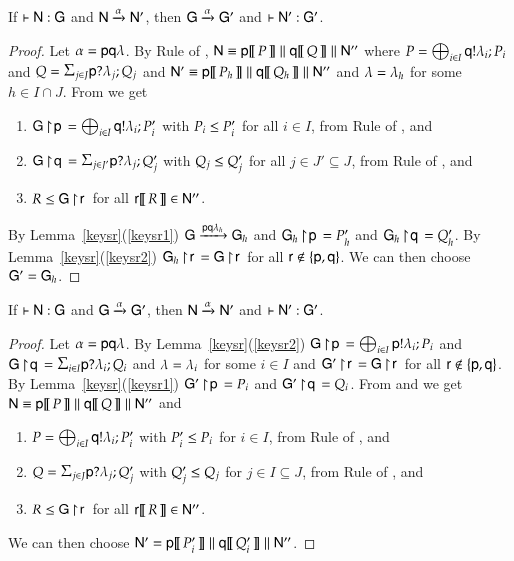 \begin{theorem}
If $\vdash {\sf N} :{\sf G}$ and ${\sf N}\xrightarrow{\alpha}{\sf N}'$, then ${\sf G}\xrightarrow{\alpha}{\sf G}'$ and \mbox{$\vdash {\sf N}' :{\sf G}'$.}
\end{theorem}
\begin{proof}
Let  $\alpha={\sf p}{\sf q}\lambda$. 
By Rule
 of , ${\sf N}\equiv {\sf p}[\![\,P\,]\!]\mathrel{\|} {\sf q}[\![\,Q\,]\!]\mathrel{\|}{\sf N}''$ where
$P=\bigoplus_{i\in I}{\sf q}!\lambda_i;P_i$ and $\Q=\inp\pp{j}{J}{\la}{\Q}$  and 
${\sf N}'\equiv{\sf p}[\![\,P_h\,]\!]\mathrel{\|} {\sf q}[\![\,Q_h\,]\!]\mathrel{\|}{\sf N}''$ and $\lambda=\lambda_h$ for some $h\in I\cap J$.
From  we get
\begin{enumerate}
\item \label{psr1} ${\sf G} \! \upharpoonright \! {\sf p}\,=\bigoplus_{i\in I}{\sf q}!\lambda_i;P'_i$ with
  $P_i\leq P'_i$ for all $i\in I$, from Rule 
 of , and
\item \label{psr2} $\proj\G{\q}=\inp\pp{j}{J'}{\la}{\Q'}$ with
  $Q_j\leq Q'_j$ for all $j\in J'\subseteq J$, from Rule  of , and
\item \label{psr3}  $R\leq{\sf G} \! \upharpoonright \! {\sf r}\,$ for all   ${\sf r}[\![\,R\,]\!]\in{\sf N}''$.
\end{enumerate}
By Lemma~\ref{keysr}(\ref{keysr1}) ${\sf G}\xrightarrow{{\sf p}{\sf q}\lambda_h}{\sf G}_h$ and ${\sf G}_h \! \upharpoonright \! {\sf p}\,=P_h'$ and ${\sf G}_h \! \upharpoonright \! {\sf q}\,=Q'_h$. By Lemma~\ref{keysr}(\ref{keysr2}) ${\sf G}_h \! \upharpoonright \! {\sf r}\,={\sf G} \! \upharpoonright \! {\sf r}\,$  for all ${\sf r}\not\in\{{\sf p},{\sf q}\}$. We can then choose ${\sf G}'={\sf G}_h$.
\end{proof}
\begin{theorem}
If $\vdash {\sf N} :{\sf G}$ and ${\sf G}\xrightarrow{\alpha}{\sf G}'$, then ${\sf N}\xrightarrow{\alpha}{\sf N}'$ and $\vdash {\sf N}' :{\sf G}'$. 
\end{theorem}
\begin{proof}
Let  $\alpha={\sf p}{\sf q}\lambda$. By Lemma~\ref{keysr}(\ref{keysr2}) ${\sf G} \! \upharpoonright \! {\sf p}\,=\bigoplus_{i\in I}{\sf p}!\lambda_i;P_i$ and $\proj\G\q=\inp\pp{i}{I}{\M}{\Q}$ and $\lambda=\lambda_i$ for some $i\in I$ and 
${\sf G}' \! \upharpoonright \! {\sf r}\,={\sf G} \! \upharpoonright \! {\sf r}\,$ for all ${\sf r}\not\in\{{\sf p},{\sf q}\}$. By Lemma~\ref{keysr}(\ref{keysr1})  ${\sf G}' \! \upharpoonright \! {\sf p}\,=P_i$ and ${\sf G}' \! \upharpoonright \! {\sf q}\,=Q_i$. From  and  we get \mbox{${\sf N}\equiv {\sf p}[\![\,P\,]\!]\mathrel{\|} {\sf q}[\![\,Q\,]\!]\mathrel{\|}{\sf N}''$} and 
\begin{enumerate}
\item \label{sfc1} $P=\bigoplus_{i\in I}{\sf q}!\lambda_i;P'_i$ with $P'_i\leq P_i$ for $i\in I$, from Rule  of , and
\item \label{sfc2}  $\Q=\inp\pp{j}{J}{\la}{\Q'}$ with $Q'_j\leq Q_j$ for $j\in I\subseteq J$, from Rule  of ,  and 
\item \label{sfc3}  $R\leq{\sf G} \! \upharpoonright \! {\sf r}\,$ for all   ${\sf r}[\![\,R\,]\!]\in{\sf N}''$.
\end{enumerate}
We can then choose ${\sf N}'={\sf p}[\![\,P'_i\,]\!]\mathrel{\|} {\sf q}[\![\,Q'_i\,]\!]\mathrel{\|}{\sf N}''$.
\end{proof} 


